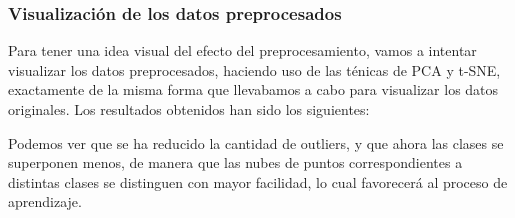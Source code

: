 \documentclass[a4]{article}
\begin{document}
\subsubsection{Visualización de los datos preprocesados}

Para tener una idea visual del efecto del preprocesamiento, vamos a intentar visualizar los datos preprocesados, haciendo uso de las ténicas de PCA y t-SNE, exactamente de la misma forma que llevabamos a cabo para visualizar los datos originales. Los resultados obtenidos han sido los siguientes: 

\begin{figure}[H]
	\centering    
	\caption{}
	\label{fig:dimreduction}
\end{figure}

Podemos ver que se ha reducido la cantidad de outliers, y que ahora las clases se superponen menos, de manera que las nubes de puntos correspondientes a distintas clases se distinguen con mayor facilidad, lo cual favorecerá al proceso de aprendizaje.
\end{document}
